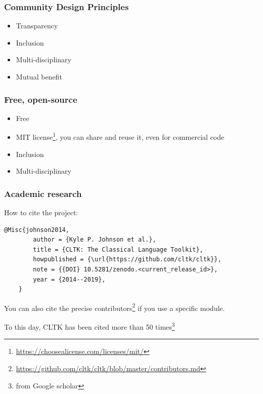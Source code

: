 \documentclass{beamer}
\begin{document}
\begin{frame}
\frametitle{Community Design Principles}
\begin{itemize}
    \item Transparency
    \item Inclusion
    \item Multi-disciplinary
    \item Mutual benefit
\end{itemize}
\end{frame}


\begin{frame}
\frametitle{Free, open-source}
\begin{itemize}
    \item Free  %
    \item MIT license\footnote{\href{https://choosealicense.com/licenses/mit/}{https://choosealicense.com/licenses/mit/}}, you can share and reuse it, even for commercial code
    \item Inclusion %
    \item Multi-disciplinary %
\end{itemize}
\end{frame}



\begin{frame}[fragile]
\frametitle{Academic research}

    How to cite the project:
    \begin{lstlisting}[basicstyle=\scriptsize,frame=single]
    @Misc{johnson2014,
        author = {Kyle P. Johnson et al.},
        title = {CLTK: The Classical Language Toolkit},
        howpublished = {\url{https://github.com/cltk/cltk}},
        note = {{DOI} 10.5281/zenodo.<current_release_id>},
        year = {2014--2019},
    }
    \end{lstlisting}
    You can also cite the precise contributors\footnote{\href{https://github.com/cltk/cltk/blob/master/contributors.md}{https://github.com/cltk/cltk/blob/master/contributors.md}} if you use a specific module.
    
    To this day, CLTK has been cited more than 50 times\footnote{from Google scholar}
\end{frame}
\end{document}
